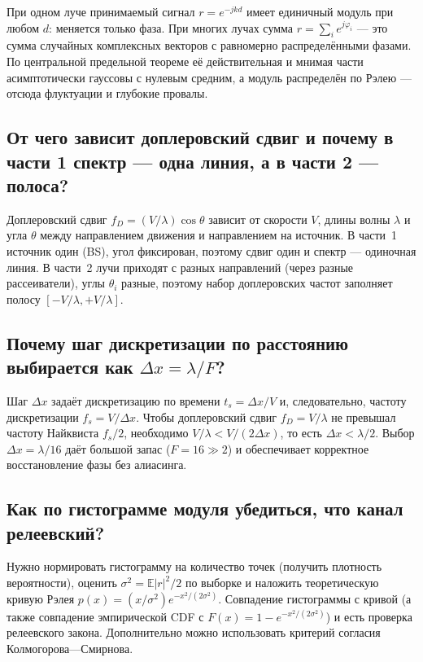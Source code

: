 При одном луче принимаемый сигнал $r = e^{-jkd}$ имеет единичный модуль
при любом $d$: меняется только фаза. При многих лучах сумма
$r = \sum_i e^{j\varphi_i}$ — это сумма случайных комплексных векторов
с равномерно распределёнными фазами. По центральной предельной теореме
её действительная и мнимая части асимптотически гауссовы с нулевым
средним, а модуль распределён по Рэлею — отсюда флуктуации и глубокие
провалы.

\subsection{От чего зависит доплеровский сдвиг и почему в части 1
спектр — одна линия, а в части 2 — полоса?}

Доплеровский сдвиг $f_D = (V/\lambda)\cos\theta$ зависит от скорости
$V$, длины волны $\lambda$ и угла $\theta$ между направлением движения
и направлением на источник. В части~1 источник один (BS), угол
фиксирован, поэтому сдвиг один и спектр — одиночная линия. В части~2
лучи приходят с разных направлений (через разные рассеиватели), углы
$\theta_i$ разные, поэтому набор доплеровских частот заполняет полосу
$[-V/\lambda, +V/\lambda]$.

\subsection{Почему шаг дискретизации по расстоянию выбирается как
$\Delta x = \lambda/F$?}

Шаг $\Delta x$ задаёт дискретизацию по времени $t_s = \Delta x/V$ и,
следовательно, частоту дискретизации $f_s = V/\Delta x$. Чтобы
доплеровский сдвиг $f_D = V/\lambda$ не превышал частоту Найквиста
$f_s/2$, необходимо $V/\lambda < V/(2\Delta x)$, то есть
$\Delta x < \lambda/2$. Выбор $\Delta x = \lambda/16$ даёт большой запас
($F = 16 \gg 2$) и обеспечивает корректное восстановление фазы без
алиасинга.

\subsection{Как по гистограмме модуля убедиться, что канал релеевский?}

Нужно нормировать гистограмму на количество точек (получить плотность
вероятности), оценить $\sigma^2 = \mathbb{E}|r|^2/2$ по выборке и
наложить теоретическую кривую Рэлея $p(x) = (x/\sigma^2)e^{-x^2/(2\sigma^2)}$.
Совпадение гистограммы с кривой (а также совпадение эмпирической CDF
с $F(x) = 1 - e^{-x^2/(2\sigma^2)}$) и есть проверка релеевского закона.
Дополнительно можно использовать критерий согласия Колмогорова—Смирнова.

